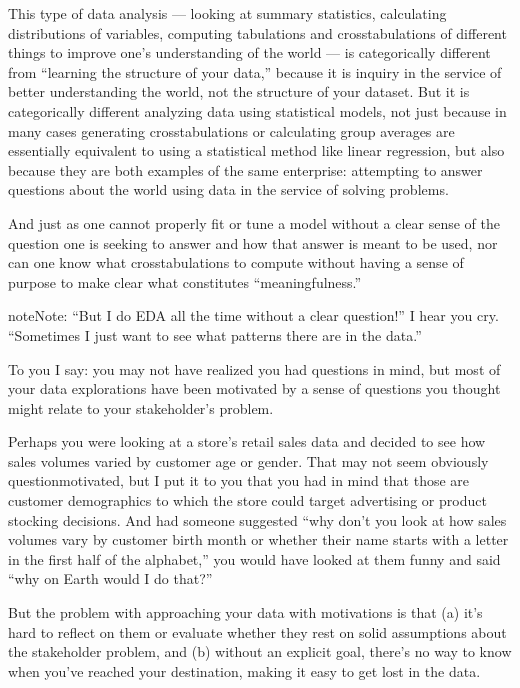 \documentclass[letterpaper,10pt,english]{jupyterBook}
\begin{document}
\sphinxAtStartPar
This type of data analysis — looking at summary statistics, calculating distributions of variables, computing tabulations and cross\sphinxhyphen{}tabulations of different things to improve one’s understanding of the world — is categorically different from “learning the structure of your data,” because it is inquiry in the service of better understanding the world, not the structure of your dataset. But it is  categorically different analyzing data using statistical models, not just because in many cases generating cross\sphinxhyphen{}tabulations or calculating group averages are essentially equivalent to using a statistical method like linear regression, but also because they are both examples of the same enterprise: attempting to answer questions about the world using data in the service of solving problems.

\sphinxAtStartPar
And just as one cannot properly fit or tune a model without a clear sense of the question one is seeking to answer and how that answer is meant to be used, nor can one know what cross\sphinxhyphen{}tabulations to compute without having a sense of purpose to make clear what constitutes “meaningfulness.”

\begin{sphinxadmonition}{note}{Note:}
\sphinxAtStartPar
“But I do EDA all the time without a clear question!” I hear you cry. “Sometimes I just want to see what patterns there are in the data.”

\sphinxAtStartPar
To you I say: you may not have realized you had questions in mind, but most of your data explorations have been  motivated by a sense of questions you thought might relate to your stakeholder’s problem.

\sphinxAtStartPar
Perhaps you were looking at a store’s retail sales data and decided to see how sales volumes varied by customer age or gender. That may not seem obviously question\sphinxhyphen{}motivated, but I put it to you that you had in mind that those are customer demographics to which the store could target advertising or product stocking decisions. And had someone suggested “why don’t you look at how sales volumes vary by customer birth month or whether their name starts with a letter in the first half of the alphabet,” you would have looked at them funny and said “why on Earth would I do that?”

\sphinxAtStartPar
But the problem with approaching your data with  motivations is that (a) it’s hard to reflect on them or evaluate whether they rest on solid assumptions about the stakeholder problem, and (b) without an explicit goal, there’s no way to know when you’ve reached your destination, making it   easy to get lost in the data.
\end{sphinxadmonition}
\end{document}

